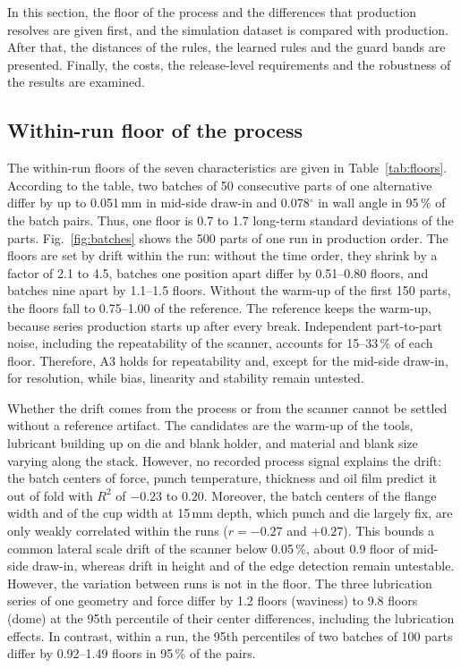 \documentclass[pdflatex,sn-basic,lineno]{sn-jnl}
\begin{document}
In this section, the floor of the process and the differences that production resolves are given first, and the simulation dataset is compared with production. After that, the distances of the rules, the learned rules and the guard bands are presented. Finally, the costs, the release-level requirements and the robustness of the results are examined.

\subsection{Within-run floor of the process}\label{sec:res-floor}

The within-run floors of the seven characteristics are given in Table~\ref{tab:floors}. According to the table, two batches of 50 consecutive parts of one alternative differ by up to 0.051\,mm in mid-side draw-in and 0.078$^\circ$ in wall angle in 95\,\% of the batch pairs. Thus, one floor is 0.7 to 1.7 long-term standard deviations of the parts. Fig.~\ref{fig:batches} shows the 500 parts of one run in production order. The floors are set by drift within the run: without the time order, they shrink by a factor of 2.1 to 4.5, batches one position apart differ by 0.51--0.80 floors, and batches nine apart by 1.1--1.5 floors. Without the warm-up of the first 150 parts, the floors fall to 0.75--1.00 of the reference. The reference keeps the warm-up, because series production starts up after every break. Independent part-to-part noise, including the repeatability of the scanner, accounts for 15--33\,\% of each floor. Therefore, A3 holds for repeatability and, except for the mid-side draw-in, for resolution, while bias, linearity and stability remain untested.

Whether the drift comes from the process or from the scanner cannot be settled without a reference artifact. The candidates are the warm-up of the tools, lubricant building up on die and blank holder, and material and blank size varying along the stack. However, no recorded process signal explains the drift: the batch centers of force, punch temperature, thickness and oil film predict it out of fold with $R^2$ of $-0.23$ to $0.20$. Moreover, the batch centers of the flange width and of the cup width at 15\,mm depth, which punch and die largely fix, are only weakly correlated within the runs ($r=-0.27$ and $+0.27$). This bounds a common lateral scale drift of the scanner below 0.05\,\%, about 0.9 floor of mid-side draw-in, whereas drift in height and of the edge detection remain untestable. However, the variation between runs is not in the floor. The three lubrication series of one geometry and force differ by 1.2 floors (waviness) to 9.8 floors (dome) at the 95th percentile of their center differences, including the lubrication effects. In contrast, within a run, the 95th percentiles of two batches of 100 parts differ by 0.92--1.49 floors in 95\,\% of the pairs.
\end{document}
